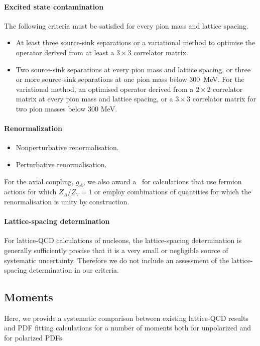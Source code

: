 \paragraph{Excited state contamination} The following criteria must be satisfied for every pion mass and lattice spacing.
\begin{itemize}
\item[\bstar] At least three source-sink  separations or a variational method to optimise the
operator derived from at least a $3\times 3$ correlator matrix. 
\item[\bcirc] Two source-sink separations at every pion mass and lattice spacing, or three or more source-sink separations at one pion mass
below 300~MeV. For the variational method, an optimised operator derived from a $2\times 2$ correlator matrix at every pion mass and
lattice spacing, or a $3\times 3$ correlator matrix for two pion masses below 300 MeV.
\end{itemize}

\paragraph{Renormalization} 
\begin{itemize}
\item[\bstar] Nonperturbative renormalisation.
\item[\bcirc] Perturbative renormalisation.
\end{itemize}
For the axial coupling, $g_A$, we also award a \bstar~for calculations that use fermion actions for which $Z_A/Z_V=1$ or employ combinations of quantities for which the renormalisation is unity by construction.

\paragraph{Lattice-spacing determination} For lattice-QCD calculations of nucleons, the lattice-spacing determination is generally 
sufficiently precise that it is a very small or negligible source
of systematic uncertainty. Therefore we do not include an assessment of the lattice-spacing
determination in our criteria.

\subsection{Moments}

Here, we provide a systematic comparison between existing
lattice-QCD results and PDF fitting calculations
for a number of moments both for unpolarized
and for polarized PDFs.
%


